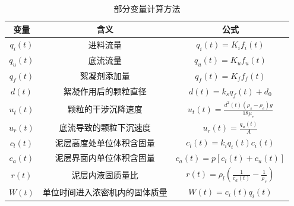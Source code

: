 \begin{table}[!ht]
  \centering
\caption{部分变量计算方法}
\label{tab:variable_calculation}
\begin{tabular}{ccc}
\toprule 变量        & 含义              & 公式
\\ \midrule
$q_i(t)$  & 进料流量            & $q _ { i } ( t ) = K _ { i } f _ { i } ( t )$                                                                \\
$q_u(t)$  & 底流流量            & $q _ { u } ( t ) = K _ { u } f _ { u } ( t )$                                                                \\
$q_f(t)$  & 絮凝剂添加量          & $q _ { f } ( t ) = K _ { f } f _ { f } ( t )$                                                                \\
$d(t)$    & 絮凝作用后的颗粒直径      & $d ( t ) = k _ { s } q _ { f } ( t ) + d _ { 0 }$                                                            \\
$u_t(t)$  & 颗粒的干涉沉降速度       & $u _ { t} ( t ) = \frac { d ^ { 2 } ( t ) \left( \rho _ { s } - \rho _ { e } \right) g } { 18 \mu _ { e } }$ \\
$u_r(t)$  & 底流导致的颗粒下沉速度     & $u _ { r } ( t ) = \frac { q _ { u } ( t ) } { A  }$                                                         \\
$c_l(t)$  & 泥层高度处单位体积含固量    & $c _ { l } ( t ) = k _ { i } q _ { i } ( t ) c _ { i } ( t )$                                                \\
$c_a(t)$  & 泥层界面内单位体积含固量    & $c _ { a } ( t ) = p \left[ c _ { l } ( t ) + c _ { u } ( t ) \right]$                                       \\
$r(t)$  & 泥层内液固质量比    & $r(t)=\rho_{l}\left(\frac{1}{c_ a(t)}-\frac{1}{\rho_s}\right)$                                        \\
$W ( t )$ & 单位时间进入浓密机内的固体质量 & $W ( t ) = c _ { i } (
t ) q _ { i } ( t )$
\\ \bottomrule
\end{tabular}
\end{table}

